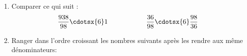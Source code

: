 \documentclass[a4paper,12pt]{article}
\begin{document}
\begin{exo}[2]
\begin{enumerate}
		\item Comparer ce qui suit  :	
\[\dfrac{938}{98}\cdotsx{6} 1 \hspace{2cm}
\dfrac{36}{98}\cdotsx{6}\dfrac{98}{36}\]

\item Ranger dans l'ordre croissant les nombres suivants après les rendre aux même dénominateurs:

	

\end{enumerate}
\anserline[6]
\end{exo}
\end{document}
